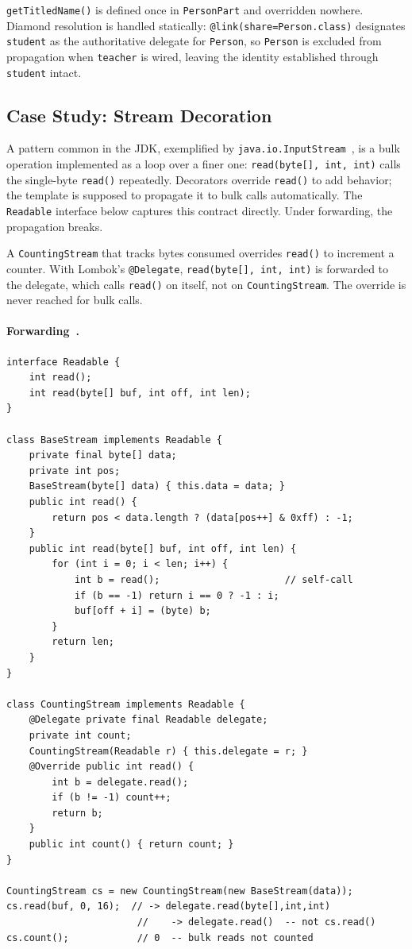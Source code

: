 \documentclass[acmsmall,nonacm]{acmart}
\theoremstyle{acmplain}
\theoremstyle{acmdefinition}
\newcommand{\code}[1]{\texttt{#1}}
\begin{document}
\code{getTitledName()} is defined once in \code{PersonPart} and overridden
nowhere. Diamond resolution is handled statically: \code{@link(share=Person.class)}
designates \code{student} as the authoritative delegate for \code{Person},
so \code{Person} is excluded from propagation when \code{teacher} is wired,
leaving the identity established through \code{student} intact.

\subsection{Case Study: Stream Decoration}

A pattern common in the JDK, exemplified by \code{java.io.InputStream}~\cite{gamma1994}, is
a bulk operation implemented as a loop over a finer one: \code{read(byte[],
int, int)} calls the single-byte \code{read()} repeatedly. Decorators override
\code{read()} to add behavior; the template is supposed to propagate it to bulk
calls automatically. The \code{Readable} interface below captures this contract
directly. Under forwarding, the propagation breaks.

A \code{CountingStream} that tracks bytes consumed overrides \code{read()} to
increment a counter. With Lombok's \code{@Delegate}, \code{read(byte[], int, int)} is
forwarded to the delegate, which calls \code{read()} on itself, not on
\code{CountingStream}. The override is never reached for bulk calls.

\paragraph{Forwarding~\cite{lombok}.}\leavevmode

\begin{lstlisting}
interface Readable {
    int read();
    int read(byte[] buf, int off, int len);
}

class BaseStream implements Readable {
    private final byte[] data;
    private int pos;
    BaseStream(byte[] data) { this.data = data; }
    public int read() {
        return pos < data.length ? (data[pos++] & 0xff) : -1;
    }
    public int read(byte[] buf, int off, int len) {
        for (int i = 0; i < len; i++) {
            int b = read();                      // self-call
            if (b == -1) return i == 0 ? -1 : i;
            buf[off + i] = (byte) b;
        }
        return len;
    }
}

class CountingStream implements Readable {
    @Delegate private final Readable delegate;
    private int count;
    CountingStream(Readable r) { this.delegate = r; }
    @Override public int read() {
        int b = delegate.read();
        if (b != -1) count++;
        return b;
    }
    public int count() { return count; }
}

CountingStream cs = new CountingStream(new BaseStream(data));
cs.read(buf, 0, 16);  // -> delegate.read(byte[],int,int)
                       //    -> delegate.read()  -- not cs.read()
cs.count();            // 0  -- bulk reads not counted
\end{lstlisting}
\end{document}
